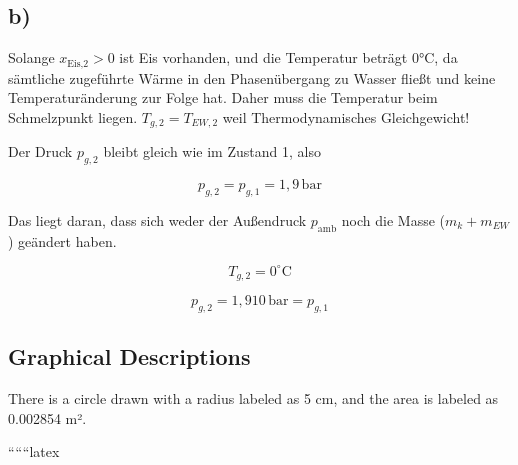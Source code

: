 

\subsection*{b)}

Solange $x_{\text{Eis,2}} > 0$ ist Eis vorhanden, und die Temperatur beträgt 0°C, da sämtliche zugeführte Wärme in den Phasenübergang zu Wasser fließt und keine Temperaturänderung zur Folge hat. Daher muss die Temperatur beim Schmelzpunkt liegen. $T_{g,2} = T_{EW,2}$ weil Thermodynamisches Gleichgewicht!

Der Druck $p_{g,2}$ bleibt gleich wie im Zustand 1, also

\[
p_{g,2} = p_{g,1} = 1{,}9 \, \text{bar}
\]

Das liegt daran, dass sich weder der Außendruck $p_{\text{amb}}$ noch die Masse ($m_k + m_{EW}$) geändert haben.

\[
T_{g,2} = 0^\circ \text{C}
\]

\[
p_{g,2} = 1{,}910 \, \text{bar} = p_{g,1}
\]

\subsection*{Graphical Descriptions}

There is a circle drawn with a radius labeled as 5 cm, and the area is labeled as 0.002854 m².

``````latex